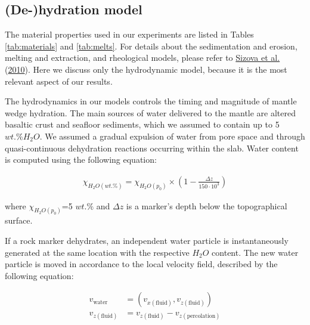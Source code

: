 \documentclass[draft,linenumbers]{agujournal2018}
\providecommand{\DIFaddbegin}{} %
\providecommand{\DIFaddend}{} %
\providecommand{\DIFdelbegin}{} %
\providecommand{\DIFdelend}{} %
\begin{document}
\clearpage

\DIFdelbegin %
\DIFdelend \DIFaddbegin \hypertarget{sec:dhydration}{%
\subsection{(De-)hydration model}\label{sec:dhydration}}
\DIFaddend 

The material properties used in our experiments are listed in Tables
\ref{tab:materials} and \ref{tab:melts}. For details about the
sedimentation and erosion, melting and extraction, and rheological
models, please refer to \protect\hyperlink{ref-Sizova2010}{Sizova et
al.} (\protect\hyperlink{ref-Sizova2010}{2010}). Here we discuss only
the hydrodynamic model, because it is the most relevant aspect of our
results.

The hydrodynamics in our models controls the timing and magnitude of
mantle wedge hydration. The main sources of water delivered to the
mantle are altered basaltic crust and seafloor sediments, which we
assumed to contain up to 5 \(wt.\% H_{2}O\). We assumed a gradual
expulsion of water from pore space and through quasi-continuous
dehydration reactions occurring within the slab. Water content is
computed using the following equation:

\[\begin{aligned}\chi_{H_{2}O(wt.\%)} = \chi_{H_{2}O(p_{0})} \times \left( 1 - \frac{\Delta z}{150 \cdot 10^{3}} \right)\end{aligned}\]

where \(\chi_{H_{2}O(p_{0})}\)=5 \(wt.\%\) and \(\Delta z\) is a
marker's depth below the topographical surface.

If a rock marker dehydrates, an independent water particle is
instantaneously generated at the same location with the respective
\(H_{2}O\) content. The new water particle is moved in accordance to the
local velocity field, described by the following equation:

\[\DIFdelbegin %
\DIFdelend \DIFaddbegin \begin{aligned}
v_{\text{water}} & = (v_{x(\text{fluid})},v_{z(\text{fluid})}) \\
v_{z(\text{fluid})} & = v_{z(\text{fluid})} - v_{z(\text{percolation})} \\
\end{aligned}\DIFaddend \]
\end{document}

